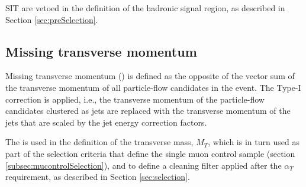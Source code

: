 SIT are vetoed in the definition of the hadronic signal region, 
as described in Section \ref{sec:preSelection}.


\subsection{Missing transverse momentum}
Missing transverse momentum (\met) is defined as the opposite of the vector sum
of the transverse momentum of all particle-flow candidates in the event.
The Type-I \met correction \cite{Khachatryan:2014gga} is applied, i.e., the transverse momentum of
the particle-flow candidates clustered as jets are replaced with the
transverse momentum of the jets that are scaled by the jet energy
correction factors.

The \met is used in the definition of 
the transverse mass, $M_{T}$, which is in turn used as part of
the selection criteria that define the single muon control sample 
(section \ref{subsec:mucontrolSelection}), and to define a cleaning filter applied after the
$\alpha_{T}$ requirement, as described in Section \ref{sec:selection}.



